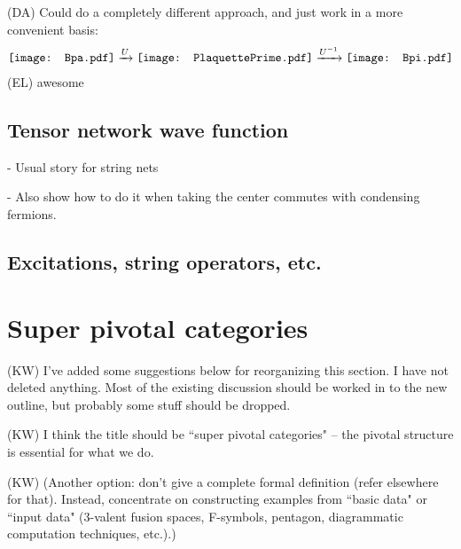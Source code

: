 \documentclass[12pt,a4paper]{article}
\newcounter{arrow}
\newcommand{\dave}[1]{{\color{ao(english)}\footnotesize{(DA) #1}}}
\newcommand{\ethan}[1]{{\color{amethyst}\footnotesize{(EL) #1}}}
\newcommand{\kw}[1]{{\color{kwcolor}\footnotesize{(KW) #1}}}
\newcommand{\Bpa}{\mathord{\vcenter{\hbox{\texttt{[image: Bpa.pdf]}}}}}
\newcommand{\Bpi}{\mathord{\vcenter{\hbox{\texttt{[image: Bpi.pdf]}}}}}
\newcommand{\PlaquettePrime}{\mathord{\vcenter{\hbox{\texttt{[image: PlaquettePrime.pdf]}}}}}
\begin{document}
 \dave{Could do a completely different approach, and just work in a more convenient basis:}
 \begin{align}
\Bpa \xrightarrow{U} \PlaquettePrime \xrightarrow{U^{-1}} \Bpi
 \end{align}
 \ethan{awesome} 
 
\subsection{Tensor network wave function}
- Usual story for string nets

- Also show how to do it when taking the center commutes with condensing fermions. 

\subsection{Excitations, string operators, etc.}
 
 
\section{Super pivotal categories}  \label{def_sect}

\kw{I've added some suggestions below for reorganizing this section.
I have not deleted anything.
Most of the existing discussion should be worked in to the new outline, but probably some stuff should be dropped.}

\kw{I think the title should be ``super pivotal categories" -- the pivotal structure is essential for what we do.}

\kw{(Another option: don't give a complete formal definition (refer elsewhere for that).  
Instead, concentrate on constructing examples from ``basic data" or ``input data" (3-valent fusion spaces, F-symbols, pentagon, 
diagrammatic computation techniques, etc.).)}
\end{document}
